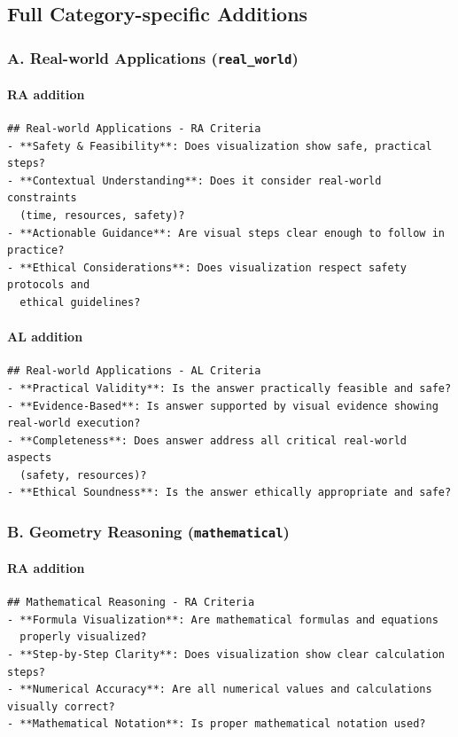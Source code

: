 \documentclass{article}
\theoremstyle{plain}
\theoremstyle{definition}
\theoremstyle{remark}
\begin{document}
\subsection{Full Category-specific Additions}

\subsubsection*{A. Real-world Applications (\texttt{real\_world})}
\paragraph{RA addition}
\begin{verbatim}
## Real-world Applications - RA Criteria
- **Safety & Feasibility**: Does visualization show safe, practical steps?
- **Contextual Understanding**: Does it consider real-world constraints
  (time, resources, safety)?
- **Actionable Guidance**: Are visual steps clear enough to follow in practice?
- **Ethical Considerations**: Does visualization respect safety protocols and
  ethical guidelines?
\end{verbatim}
\paragraph{AL addition}
\begin{verbatim}
## Real-world Applications - AL Criteria
- **Practical Validity**: Is the answer practically feasible and safe?
- **Evidence-Based**: Is answer supported by visual evidence showing real-world execution?
- **Completeness**: Does answer address all critical real-world aspects
  (safety, resources)?
- **Ethical Soundness**: Is the answer ethically appropriate and safe?
\end{verbatim}

\subsubsection*{B. Geometry Reasoning (\texttt{mathematical})}
\paragraph{RA addition}
\begin{verbatim}
## Mathematical Reasoning - RA Criteria
- **Formula Visualization**: Are mathematical formulas and equations
  properly visualized?
- **Step-by-Step Clarity**: Does visualization show clear calculation steps?
- **Numerical Accuracy**: Are all numerical values and calculations visually correct?
- **Mathematical Notation**: Is proper mathematical notation used?
\end{verbatim}
\end{document}
